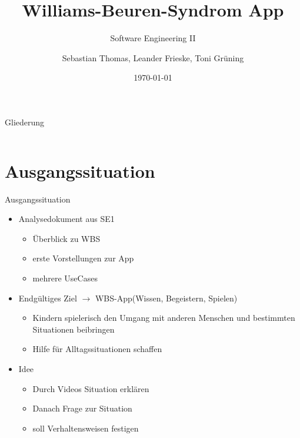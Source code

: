 \documentclass[10pt,fleqn]{beamer}
\title[WBS]{Williams-Beuren-Syndrom App}
\subtitle[]{Software Engineering II}
\date{\today}
\author{Sebastian Thomas, Leander Frieske, Toni Grüning}
\begin{document}

\begin{frame}
	\titlepage
\end{frame}

\begin{frame}{Gliederung}
 	\begin{columns}
   		\begin{column}{10.0cm}
		    \renewcommand{\baselinestretch}{1.5}
		    \normalsize
		    \tableofcontents
		    \renewcommand{\baselinestretch}{1.0}
		    \normalsize
	   	\end{column}
	   	\hspace*{-1.3cm}
	\end{columns}
\end{frame}


\section{Ausgangssituation}
\begin{frame}[t]{Ausgangssituation}
	\begin{itemize}
		\item Analysedokument aus SE1
		\begin{itemize}
			\item Überblick zu WBS
			\item erste Vorstellungen zur App
			\item mehrere UseCases
		\end{itemize}
	\item Endgültiges Ziel $\rightarrow$ WBS-App(Wissen, Begeistern, Spielen)
		\begin{itemize}
			\item Kindern spielerisch den Umgang mit anderen Menschen und bestimmten Situationen beibringen
			\item Hilfe für Alltagssituationen schaffen
		\end{itemize}
	\item Idee
		\begin{itemize}
			\item Durch Videos Situation erklären
			\item Danach Frage zur Situation
			\item soll Verhaltensweisen festigen
		\end{itemize}
	\end{itemize}
\end{frame}
\end{document}
